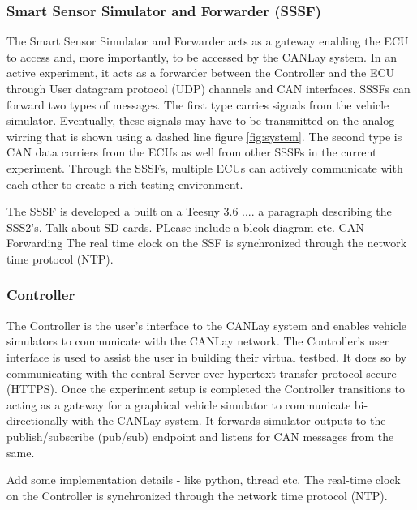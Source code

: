 \documentclass[letterpaper,twocolumn,12pt]{article}
\begin{document}
\subsubsection{Smart Sensor Simulator and Forwarder (SSSF)}
The Smart Sensor Simulator and Forwarder acts as a gateway enabling the ECU to access and, more importantly, to be accessed by the CANLay system. In an active experiment, it acts as a forwarder between the Controller and the ECU through User datagram protocol (UDP) channels and CAN interfaces. SSSFs can forward two types of messages. 
The first type carries signals from the vehicle simulator. Eventually, these signals may have to be transmitted on the analog wirring that is shown using a dashed line figure \ref{fig:system}.  
The second type is CAN data carriers from the ECUs as well from other SSSFs in the current experiment. Through the SSSFs, multiple ECUs can actively communicate with each other to create a rich testing environment.

The SSSF is developed a built on a Teesny 3.6 .... a paragraph describing the SSS2's. Talk about SD cards. PLease include a blcok diagram etc.
CAN Forwarding 
The real time clock on the SSF is synchronized through the network time protocol (NTP).

\subsubsection{Controller}
The Controller is the user's interface to the CANLay system and enables vehicle simulators to communicate with the CANLay network. The Controller’s user interface is used to assist the user in building their virtual testbed. 
It does so by communicating with the central Server over hypertext transfer protocol secure (HTTPS). 
Once the experiment setup is completed the Controller transitions to acting as a gateway for a graphical vehicle simulator to communicate bi-directionally with the CANLay system. It forwards simulator outputs to the publish/subscribe (pub/sub) endpoint and listens for CAN messages from the same.

Add some implementation details - like python, thread etc.
The real-time clock on the Controller is synchronized through the network time protocol (NTP).
\end{document}
